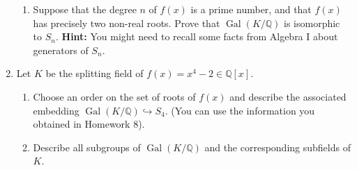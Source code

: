 \documentclass[12pt,
psamsfonts]{amsart}
\theoremstyle{remark}
\theoremstyle{definition}
\newcommand{\N}{\mathbb{N}\xspace}
\newcommand{\R}{\mathbb{R}\xspace}
\newcommand{\Q}{\mathbb{Q}\xspace}
\newcommand{\F}{\mathbb{F}\xspace}
\DeclareMathOperator{\Aut}{Aut}
\DeclareMathOperator{\Gal}{Gal}
\numberwithin{equation}{section}
\begin{document}
\begin{enumerate}
\begin{enumerate}
\item Suppose that the degree $n$ of $f(x)$ is a  prime number, and that $f(x)$ has precisely two non-real roots. Prove that $\Gal(K/\Q)$ is isomorphic to $S_n$. \textbf{Hint:} You might need to recall some facts from Algebra I about generators of $S_n$. 
\end{enumerate} 
\medskip
\medskip 
\item Let $K$ be the splitting field of $f(x)=x^4-2\in\Q[x]$. 
\begin{enumerate}
\item  Choose an order on the set of roots of $f(x)$ and describe the associated embedding $\Gal(K/\Q)\hookrightarrow S_4$. (You can use the information you obtained in Homework 8).  
\item Describe all subgroups of $\Gal(K/\Q)$ and the corresponding subfields of $K$. 
\end{enumerate}
\medskip

\end{enumerate}
\end{document}
